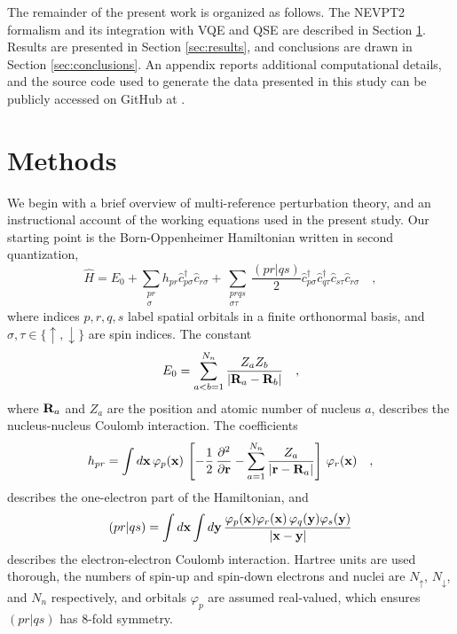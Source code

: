 \documentclass[aps,pra,twocolumn]{revtex4-2}
\newcommand{\crt}[1]{\hat{c}_{#1}^\dagger}
\newcommand{\dst}[1]{\hat{c}_{#1}^{\phantom{\dagger}}}
\newcommand*\vett[1]{{\bf{#1}}}
\begin{document}
The remainder of the present work is organized as follows. The NEVPT2 formalism and its integration with VQE and QSE are described in Section \ref{sec:methods}.
Results are presented in Section \ref{sec:results}, and conclusions are drawn in Section \ref{sec:conclusions}. An appendix reports additional computational details,
and the source code used to generate the data presented in this study can be publicly accessed on GitHub at \cite{tammaro2022github}.

\section{Methods}
\label{sec:methods}

We begin with a brief overview of multi-reference perturbation theory, and an instructional account of the working equations used in the present study. 
Our starting point is the Born-Oppenheimer Hamiltonian written in second quantization,
\begin{equation}
\hat{H} = E_0 + \sum_{\substack{pr \\ \sigma}} h_{pr} \crt{p\sigma} \dst{r\sigma} + \sum_{\substack{prqs \\ \sigma\tau}} \frac{(pr|qs)}{2} \crt{p\sigma} \crt{q\tau} \dst{s\tau}  \dst{r\sigma} 
\quad,
\end{equation}
where indices $p,r,q,s$ label spatial orbitals in a finite orthonormal basis, and $\sigma,\tau \in \{ \uparrow,\downarrow \}$ are spin indices. The constant 
\begin{equation}
E_0 = \sum_{a<b=1}^{N_n} \frac{Z_a Z_b}{| \vett{R}_a - \vett{R}_b|} \quad,
\end{equation}
where $\vett{R}_a$ and $Z_a$ are the position and atomic number of nucleus $a$, describes the nucleus-nucleus Coulomb interaction.
The coefficients 
\begin{equation}
h_{pr} = \int d {\bf{x}} \, \varphi_p({\bf{x}}) \, \left[ - \frac{1}{2} \, \frac{\partial^2}{\partial \vett{r}}  - \sum_{a=1}^{N_n} \frac{Z_a}{| \vett{r} - \vett{R}_a |} \right] \, \varphi_r({\bf{x}})
\quad,
\end{equation}
describes the one-electron part of the Hamiltonian, and
\begin{equation}
(pr|qs) = \int d {\bf{x}} \int d {\bf{y}} \,  \frac{ \varphi_p({\bf{x}}) \varphi_r({\bf{x}}) \, \varphi_q({\bf{y}}) \varphi_s({\bf{y}}) }{ |\vett{x} - \vett{y} | }
\end{equation}
describes the electron-electron Coulomb interaction. 
Hartree units are used thorough, the numbers of spin-up and spin-down electrons and nuclei are $N_\uparrow$, $N_\downarrow$, and $N_n$ respectively,
and orbitals $\varphi_p$ are assumed real-valued, which ensures $(pr|qs)$ has 8-fold symmetry.
\end{document}
